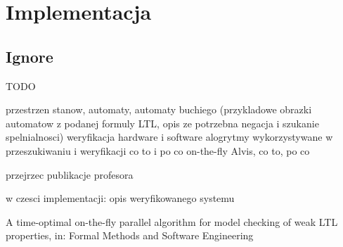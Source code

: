\chapter{Implementacja}


\section{Ignore}

TODO

przestrzen stanow, automaty, automaty buchiego (przykladowe obrazki automatow z podanej formuly LTL, opis ze potrzebna negacja i szukanie spelnialnosci)
weryfikacja hardware i software
alogrytmy wykorzystywane w przeszukiwaniu i weryfikacji
co to i po co on-the-fly
Alvis, co to, po co

 \cite{Jac05}
przejrzec publikacje profesora


w czesci implementacji:
opis weryfikowanego systemu


A time-optimal on-the-fly parallel algorithm for model checking of weak LTL properties, in: Formal Methods and Software Engineering
